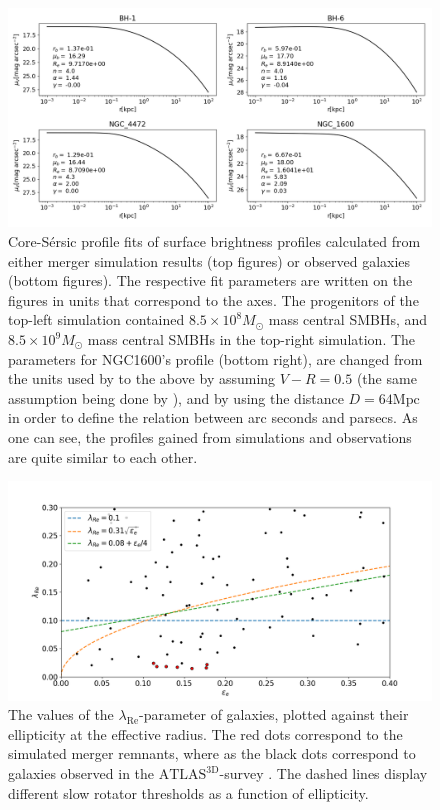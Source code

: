 \documentclass[english, oneside]{HYgradu}
\begin{document}
\begin{figure}[h]
	\centering
	\includegraphics[width=\textwidth]{core_sersic_fits_obs_and_sim.png}
	\caption{Core-Sérsic profile fits of surface brightness profiles calculated from either merger simulation results (top figures) or observed galaxies (bottom figures). The respective fit parameters are written on the figures in units that correspond to the axes. The progenitors of the top-left simulation contained $8.5 \times 10^8 M_\odot$ mass central SMBHs, and $8.5 \times 10^9 M_\odot$ mass central SMBHs in the top-right simulation. The parameters for NGC1600's profile (bottom right), are changed from the units used by \cite{Thomas2016} to the above by assuming $V - R = 0.5$ (the same assumption being done by \cite{Lauer2007}), and by using the distance $D = 64 \mathrm{Mpc}$ \citep{Thomas2016} in order to define the relation between arc seconds and parsecs. As one can see, the profiles gained from simulations and observations are quite similar to each other.}
\end{figure}

\begin{figure}[h]
	\centering
	\includegraphics[width=\textwidth]{lambda_epsilon.png}
	\caption{The values of the $\lambda_{\mathrm{Re}}$-parameter of galaxies, plotted against their ellipticity at the effective radius. The red dots correspond to the simulated merger remnants, where as the black dots correspond to galaxies observed in the $\mathrm{ATLAS^{3D}}$-survey \citep{Emsellem2011}. The dashed lines display different slow rotator thresholds as a function of ellipticity.}
\end{figure}
\end{document}

